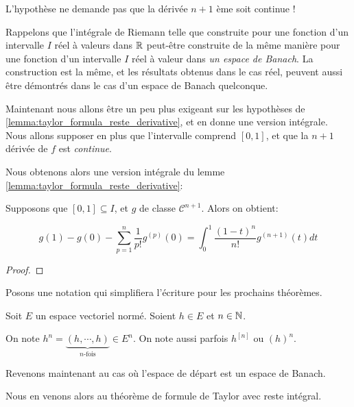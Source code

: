 \begin{remarque}
	L'hypothèse ne demande pas que la dérivée $n + 1$ ème soit continue !
\end{remarque}

Rappelons que l'intégrale de Riemann telle que construite pour une fonction d'un
intervalle $I$ réel à valeurs dans $\mathbb{R}$  peut-être construite de la même
manière pour une fonction d'un intervalle $I$ réel à valeur dans \textit{un
espace de Banach}. La construction est la même, et les résultats obtenus dans le
cas réel, peuvent aussi être démontrés dans le cas d'un espace de Banach
quelconque.

Maintenant nous allons être un peu plus exigeant sur les hypothèses de
\ref{lemma:taylor_formula_reste_derivative}, et en donne une version intégrale.
Nous allons supposer en plus que l'intervalle comprend $[0, 1]$, et que la $n +
1$ dérivée de $f$ est \textit{continue}.

Nous obtenons alors une version intégrale du lemme
\ref{lemma:taylor_formula_reste_derivative}:

\begin{corollary}
	\label{corollary:taylor_formula_reste_integral}
	Supposons que $[0, 1] \subseteq I$, et $g$ de classe $\mathcal{C}^{n + 1}$.
	Alors on obtient:

	\begin{equation*}
		g(1) - g(0) - \displaystyle \sum_{p = 1}^{n} \frac{1}{p!} g^{(p)}(0) =
		\int_{0}^{1} \frac{(1 - t)^{n}}{n!} g^{(n + 1)}(t) dt
	\end{equation*}
\end{corollary}

\ifdefined\outputproof
\begin{proof}

\end{proof}
\fi

Posons une notation qui simplifiera l'écriture pour les prochains théorèmes.

\begin{notation}
	Soit $E$ un espace vectoriel normé. Soient $h \in E$ et $n \in \mathbb{N}$.

	On note $h^{n} = \underbrace{(h, \cdots, h)}_{\text{$n$-fois}} \in E^{n}$.
	On note aussi parfois $h^{[n]}$ ou $(h)^{n}$.
\end{notation}

Revenons maintenant au cas où l'espace de départ est un espace de Banach.

Nous en venons alors au théorème de formule de Taylor avec reste intégral.

